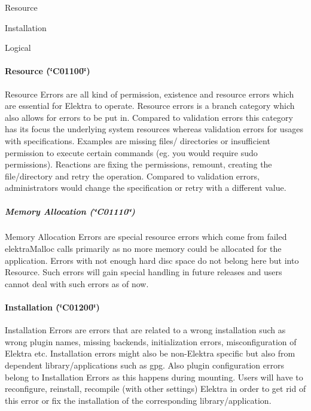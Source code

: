 \begin{DoxyItemize}
\item Resource
\item Installation
\item Logical
\end{DoxyItemize}

\paragraph*{Resource (\char`\"{}\+C01100\char`\"{})}

{\ttfamily Resource Errors} are all kind of permission, existence and resource errors which are essential for Elektra to operate. Resource errors is a branch category which also allows for errors to be put in. Compared to validation errors this category has its focus the underlying system resources whereas validation errors for usages with specifications. Examples are missing files/ directories or insufficient permission to execute certain commands (eg. you would require sudo permissions). Reactions are fixing the permissions, remount, creating the file/directory and retry the operation. Compared to validation errors, administrators would change the specification or retry with a different value.

\subparagraph*{Memory Allocation (\char`\"{}\+C01110\char`\"{})}

{\ttfamily Memory Allocation Errors} are special resource errors which come from failed {\ttfamily elektra\+Malloc} calls primarily as no more memory could be allocated for the application. Errors with not enough hard disc space do not belong here but into {\ttfamily Resource}. Such errors will gain special handling in future releases and users cannot deal with such errors as of now.

\paragraph*{Installation (\char`\"{}\+C01200\char`\"{})}

{\ttfamily Installation Errors} are errors that are related to a wrong installation such as wrong plugin names, missing backends, initialization errors, misconfiguration of Elektra etc. Installation errors might also be non-\/\+Elektra specific but also from dependent library/applications such as gpg. Also plugin configuration errors belong to {\ttfamily Installation Errors} as this happens during mounting. Users will have to reconfigure, reinstall, recompile (with other settings) Elektra in order to get rid of this error or fix the installation of the corresponding library/application.


